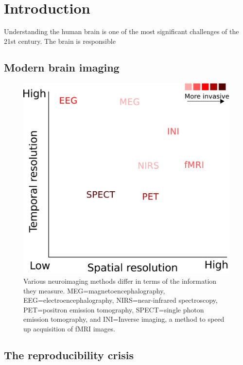 \chapter{Introduction}

Understanding the human brain is one of the most significant challenges of the 21st century. The brain is responsible

\section{Modern brain imaging}

\begin{figure}[htb]
\begin{center}
   \includegraphics[width=0.4\linewidth]{figures/neuroimaging_methods.pdf}
\end{center}
   \caption[Various neuroimaging methods differ in terms of the information they measure.]{Various neuroimaging methods differ in terms of the information they measure. MEG=magnetoencephalography, EEG=electroencephalography, NIRS=near-infrared spectroscopy, PET=positron emission tomography, SPECT=single photon emission tomography, and INI=Inverse imaging, a method to speed up acquisition of fMRI images.}
   \label{fig:neuroimaging_methods}
\end{figure}

\section{The reproducibility crisis}

